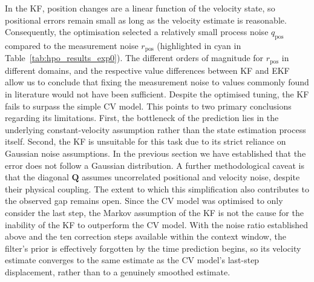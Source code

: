 In the \ac{KF}, position changes are a linear function of the velocity state, so positional errors remain small as long as the velocity estimate is reasonable.
Consequently, the optimisation selected a relatively small process noise $q_\text{pos}$ compared to the measurement noise $r_\text{pos}$ (highlighted in cyan in Table~\ref{tab:hpo_results_exp0}).
The different orders of magnitude for $r_\text{pos}$ in different domains, and the respective value differences between \ac{KF} and \ac{EKF} allow us to conclude that fixing the measurement noise to values commonly found in literature would not have been sufficient.
Despite the optimised tuning, the \ac{KF} fails to surpass the simple \ac{CV} model. This points to two primary conclusions regarding its limitations.
First, the bottleneck of the prediction lies in the underlying constant-velocity assumption rather than the state estimation process itself. Second, the \ac{KF} is unsuitable for this task due to its strict reliance on Gaussian noise assumptions. In the previous section we have established that the error does not follow a Gaussian distribution.
A further methodological caveat is that the diagonal $\mathbf{Q}$ assumes uncorrelated positional and velocity noise, despite their physical coupling. The extent to which this simplification also contributes to the observed gap remains open.
Since the \ac{CV} model was optimised to only consider the last step, the Markov assumption of the \ac{KF} is not the cause for the inability of the \ac{KF} to outperform the \ac{CV} model. With the noise ratio established above and the ten correction steps available within the context window, the filter's prior is effectively forgotten by the time prediction begins, so its velocity estimate converges to the same estimate as the \ac{CV} model's last-step displacement, rather than to a genuinely smoothed estimate.

